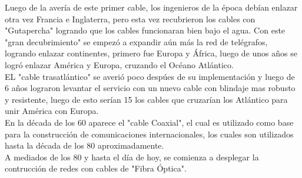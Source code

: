 \documentclass{article}
\begin{document}
Luego de la avería de este primer cable, los ingenieros de la época debían enlazar otra vez Francia e Inglaterra, pero esta vez recubrieron los cables con "Gutapercha" logrando que los cables funcionaran bien bajo el agua. Con este "gran decubrimiento" se empezó a expandir aún más la red de telégrafos, logrando enlazar continentes, primero fue Europa y África, luego de unos años se logró enlazar América y Europa, cruzando el Océano Atlántico.\\

EL "cable trasatlántico" se averió poco despúes de su implementación y luego de 6 años lograron levantar el servicio con un nuevo cable con blindaje mas robusto y resistente, luego de esto serían 15 los cables que cruzarían los Atlántico para unir América con Europa.\\

En la década de los 60 aparece el "cable Coaxial", el cual es utilizado como base para la construcción de comunicaciones internacionales, los cuales son utilizados hasta la década de los 80 aproximadamente.\\

A mediados de los 80 y hasta el día de hoy, se comienza a desplegar la  contrucción de redes con cables de "Fibra Óptica".
\end{document}
